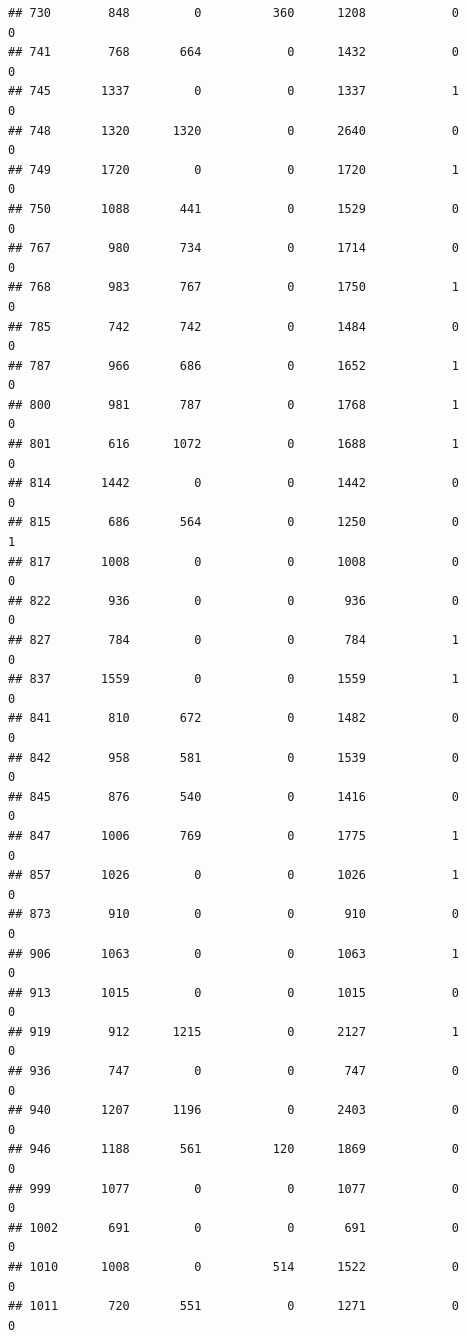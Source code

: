 \documentclass[]{article}
\begin{document}
\begin{verbatim}
## 730        848         0          360      1208            0            0
## 741        768       664            0      1432            0            0
## 745       1337         0            0      1337            1            0
## 748       1320      1320            0      2640            0            0
## 749       1720         0            0      1720            1            0
## 750       1088       441            0      1529            0            0
## 767        980       734            0      1714            0            0
## 768        983       767            0      1750            1            0
## 785        742       742            0      1484            0            0
## 787        966       686            0      1652            1            0
## 800        981       787            0      1768            1            0
## 801        616      1072            0      1688            1            0
## 814       1442         0            0      1442            0            0
## 815        686       564            0      1250            0            1
## 817       1008         0            0      1008            0            0
## 822        936         0            0       936            0            0
## 827        784         0            0       784            1            0
## 837       1559         0            0      1559            1            0
## 841        810       672            0      1482            0            0
## 842        958       581            0      1539            0            0
## 845        876       540            0      1416            0            0
## 847       1006       769            0      1775            1            0
## 857       1026         0            0      1026            1            0
## 873        910         0            0       910            0            0
## 906       1063         0            0      1063            1            0
## 913       1015         0            0      1015            0            0
## 919        912      1215            0      2127            1            0
## 936        747         0            0       747            0            0
## 940       1207      1196            0      2403            0            0
## 946       1188       561          120      1869            0            0
## 999       1077         0            0      1077            0            0
## 1002       691         0            0       691            0            0
## 1010      1008         0          514      1522            0            0
## 1011       720       551            0      1271            0            0

\end{verbatim}
\end{document}
